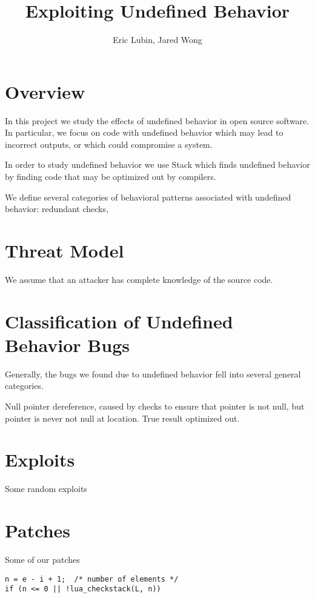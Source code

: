 \documentclass[11pt,twocolumn]{article}
\title{Exploiting Undefined Behavior}
\author{Eric Lubin, Jared Wong}
\begin{document}
\maketitle

\section{Overview}
In this project we study the effects of undefined behavior in open source
software. In particular, we focus on code with undefined behavior which may
lead to incorrect outputs, or which could compromise a system.

In order to study undefined behavior we use Stack\cite{stack} which finds undefined
behavior by finding code that may be optimized out by compilers.

We define several categories of behavioral patterns associated with undefined
behavior: redundant checks, 

\section{Threat Model}
We assume that an attacker has complete knowledge of the source code.

\section{Classification of Undefined Behavior Bugs}
Generally, the bugs we found due to undefined behavior fell into several
general categories.

Null pointer dereference, caused by checks to ensure that pointer is not null,
but pointer is never not null at location. True result optimized out.

\section{Exploits}
Some random exploits

\section{Patches}
Some of our patches

\begin{lstlisting}
n = e - i + 1;  /* number of elements */
if (n <= 0 || !lua_checkstack(L, n))
\end{lstlisting}



\end{document}
